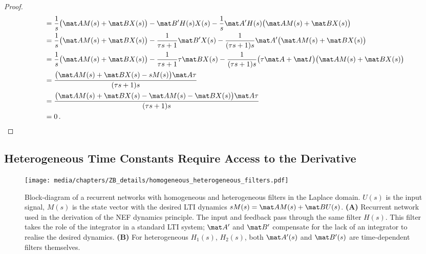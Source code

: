 \begin{proof}
\begin{align*}
	&= \frac{1}{s} \bigl( \mat A M(s) + \mat B X(s) \bigr)
	 - \mat B' H(s) X(s)
	 - \frac{1}{s} \mat A' H(s) \bigl(\mat A M(s) + \mat B X(s)\bigr) \\
	&= \frac{1}{s} \bigl( \mat A M(s) + \mat B X(s) \bigr)
	 - \frac{1}{\tau s + 1} \mat B' X(s)
	 - \frac{1}{(\tau s + 1) s} \mat A' \bigl( \mat A M(s) + \mat B X(s) \bigr) \\
	&= \frac{1}{s} \bigl( \mat A M(s) + \mat B X(s) \bigr)
	 - \frac{1}{\tau s + 1} \tau \mat B X(s)
	 - \frac{1}{(\tau s + 1) s} \bigl(\tau \mat A + \mat I \bigr) \bigl(\mat A M(s) + \mat B X(s)\bigr) \\
	&= \frac{\bigl(\mat A M(s) + \mat B X(s) - s M(s)\bigr) \mat A \tau}{(\tau s + 1) s} \\
	&= \frac{\bigl(\mat A M(s) + \mat B X(s) - \mat A M(s) - \mat B X(s)\bigr) \mat A \tau}{(\tau s + 1) s} \\
	&= 0 \,. \qedhere
\end{align*}
\end{proof}

\subsection{Heterogeneous Time Constants Require Access to the Derivative}
\label{app:heterogenous_time_constants}

\begin{figure}
	\texttt{[image: media/chapters/ZB\_details/homogeneous\_heterogeneous\_filters.pdf]}%
	{\label{fig:homogeneous_heterogeneous_filters_a}}%
	{\label{fig:homogeneous_heterogeneous_filters_b}}%
	\caption[Block-diagram of a recurrent networks with homogeneous and heterogeneous filters]{Block-diagram of a recurrent networks with homogeneous and heterogeneous filters in the Laplace domain. $U(s)$ is the input signal, $M(s)$ is the state vector with the desired LTI dynamics $s M(s) = \mat A M(s) + \mat B U(s)$.
	\textbf{(A)} Recurrent network used in the derivation of the NEF dynamics principle. The input and feedback pass through the same filter $H(s)$.
	This filter takes the role of the integrator in a standard LTI system; $\mat A'$ and $\mat B'$ compensate for the lack of an integrator to realise the desired dynamics.
	\textbf{(B)} For heterogeneous $H_1(s)$, $H_2(s)$, both $\mat A'(s)$ and $\mat B'(s)$ are time-dependent filters themselves.
	}
	\label{fig:homogeneous_heterogeneous_filters}
\end{figure}


